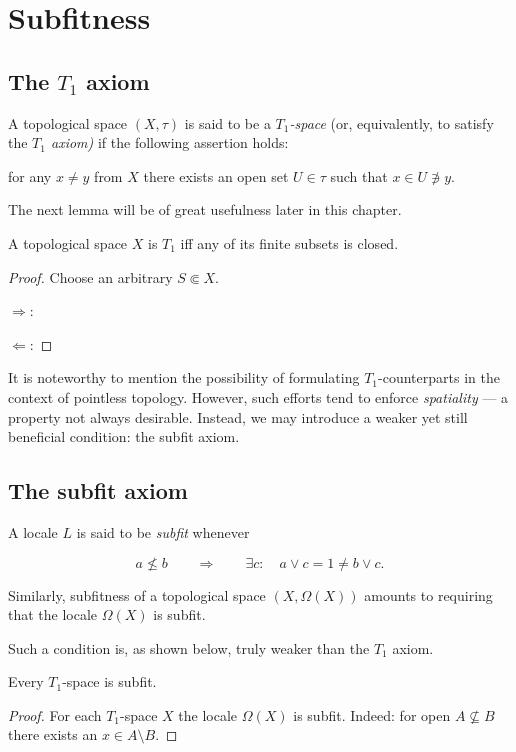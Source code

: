\chapter{Subfitness}

\section{The $T_1$ axiom}

\begin{df}[$T_1$]
  A topological space $(X, \tau)$ is said to be a {\sl $T_1$-space\/} (or,
  equivalently, to satisfy the {\sl $T_1$ axiom)\/} if the following assertion
  holds:

  \begin{center}
    for any $x \ne y$ from $X$ there exists an open set $U \in \tau$ such that $x
    \in U \not\owns y$.
  \end{center}
\end{df}

The next lemma will be of great usefulness later in this chapter.

\begin{lem}
  A topological space $X$ is $T_1$ iff any of its finite subsets is closed.
\end{lem}

\begin{proof}
  Choose an arbitrary $S \Subset X$.

  $\Rightarrow$:

  $\Leftarrow$:
\end{proof}

It is noteworthy to mention the possibility of formulating $T_1$-counterparts
in the context of pointless topology.
However, such efforts tend to enforce {\sl spatiality\/} --- a property not
always desirable.
Instead, we may introduce a weaker yet still beneficial condition: the subfit
axiom.

\section{The subfit axiom}

\begin{df}[Sfit]
  A locale $L$ is said to be {\sl subfit\/} whenever

  \[
    a \not\le b \qquad \Rightarrow \qquad \exists c: \quad a \vee c = 1 \ne b
    \vee c.
  \]
\end{df}

Similarly, subfitness of a topological space $(X, \Omega(X))$ amounts to
requiring that the locale $\Omega(X)$ is subfit.

Such a condition is, as shown below, truly weaker than the $T_1$ axiom.

\begin{prop}
  Every $T_1$-space is subfit.
\end{prop}

\begin{proof}
  For each $T_1$-space $X$ the locale $\Omega(X)$ is subfit.
  Indeed: for open $A \not\subseteq B$ there exists an $x \in A \setminus B$.
\end{proof}
